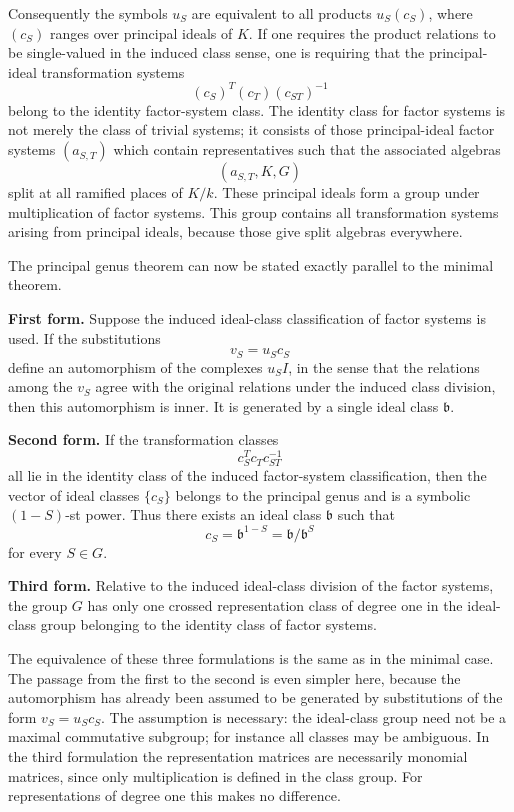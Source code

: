 \documentclass[12pt]{article}
\begin{document}
Consequently the symbols \(u_S\) are equivalent to all products \(u_S(c_S)\), where \((c_S)\) ranges over principal ideals of \(K\). If one requires the product relations to be single-valued in the induced class sense, one is requiring that the principal-ideal transformation systems
\[
  (c_S)^T(c_T)(c_{ST})^{-1}
\]
belong to the identity factor-system class. The identity class for factor systems is not merely the class of trivial systems; it consists of those principal-ideal factor systems \((a_{S,T})\) which contain representatives such that the associated algebras
\[
  (a_{S,T},K,G)
\]
split at all ramified places of \(K/k\). These principal ideals form a group under multiplication of factor systems. This group contains all transformation systems arising from principal ideals, because those give split algebras everywhere.

The principal genus theorem can now be stated exactly parallel to the minimal theorem.

\textbf{First form.} Suppose the induced ideal-class classification of factor systems is used. If the substitutions
\[
  v_S=u_S c_S
\]
define an automorphism of the complexes \(u_S I\), in the sense that the relations among the \(v_S\) agree with the original relations under the induced class division, then this automorphism is inner. It is generated by a single ideal class \(\mathfrak b\).

\textbf{Second form.} If the transformation classes
\[
  c_S^T c_T c_{ST}^{-1}
\]
all lie in the identity class of the induced factor-system classification, then the vector of ideal classes \(\{c_S\}\) belongs to the principal genus and is a symbolic \((1-S)\)-st power. Thus there exists an ideal class \(\mathfrak b\) such that
\[
  c_S=\mathfrak b^{1-S}=\mathfrak b/\mathfrak b^S
\]
for every \(S\in G\).

\textbf{Third form.} Relative to the induced ideal-class division of the factor systems, the group \(G\) has only one crossed representation class of degree one in the ideal-class group belonging to the identity class of factor systems.

The equivalence of these three formulations is the same as in the minimal case. The passage from the first to the second is even simpler here, because the automorphism has already been assumed to be generated by substitutions of the form \(v_S=u_Sc_S\). The assumption is necessary: the ideal-class group need not be a maximal commutative subgroup; for instance all classes may be ambiguous. In the third formulation the representation matrices are necessarily monomial matrices, since only multiplication is defined in the class group. For representations of degree one this makes no difference.
\end{document}
